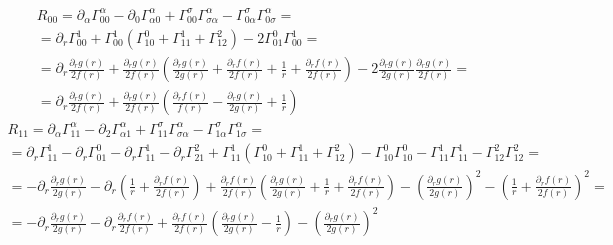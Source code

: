 \documentclass{article}
\begin{document}
\begin{equation}
\begin{gathered}
    R_{00} =
    \partial_\alpha \Gamma^\alpha_{00}
    - \partial_0 \Gamma^\alpha_{\alpha 0}
    + \Gamma^{\sigma}_{00}\Gamma^{\alpha}_{\sigma\alpha} 
    - \Gamma^{\sigma}_{0\alpha}\Gamma^{\alpha}_{0 \sigma} = \\ =
    \partial_r \Gamma^1_{00}
    + \Gamma^{1}_{00}\left(\Gamma^{0}_{10} + \Gamma^{1}_{11} + \Gamma^{2}_{12}\right)
    - 2\Gamma^{0}_{01}\Gamma^{1}_{00}
    = \\ =
    \partial_r \frac{\partial_{r}g(r)}{2f(r)}
    + \frac{\partial_{r}g(r)}{2f(r)}\left(\frac{\partial_{r}g(r)}{2g(r)} + \frac{\partial_r f(r)}{2f(r)} + \frac{1}{r} + \frac{\partial_r f(r)}{2f(r)}\right)
    - 2\frac{\partial_{r}g(r)}{2g(r)}\frac{\partial_{r}g(r)}{2f(r)}
    = \\ =
    \partial_r \frac{\partial_{r}g(r)}{2f(r)}
    + \frac{\partial_{r}g(r)}{2f(r)}\left(\frac{\partial_r f(r)}{f(r)} - \frac{\partial_{r}g(r)}{2g(r)} + \frac{1}{r}\right)
\end{gathered}
\end{equation}
\begin{equation}
\begin{gathered}
    R_{11} =
    \partial_\alpha \Gamma^\alpha_{11}
    - \partial_2 \Gamma^\alpha_{\alpha 1}
    + \Gamma^{\sigma}_{11}\Gamma^{\alpha}_{\sigma\alpha} 
    - \Gamma^{\sigma}_{1\alpha}\Gamma^{\alpha}_{1 \sigma} = \\ =
    \partial_r \Gamma^1_{11}
    - \partial_r \Gamma^0_{01}
    - \partial_r \Gamma^1_{11}
    - \partial_r \Gamma^2_{21}
    + \Gamma^{1}_{11}\left(\Gamma^{0}_{10} + \Gamma^{1}_{11} + \Gamma^{2}_{12}\right)
    - \Gamma^{0}_{10}\Gamma^{0}_{10}
    - \Gamma^{1}_{11}\Gamma^{1}_{11}
    - \Gamma^{2}_{12}\Gamma^{2}_{12} = \\ =
    - \partial_r \frac{\partial_{r}g(r)}{2g(r)}
    - \partial_r \left(\frac{1}{r} + \frac{\partial_r f(r)}{2f(r)}\right)
    + \frac{\partial_r f(r)}{2f(r)}\left(\frac{\partial_{r}g(r)}{2g(r)} + \frac{1}{r} + \frac{\partial_r f(r)}{2f(r)}\right)
    - \left(\frac{\partial_{r}g(r)}{2g(r)}\right)^2
    - \left(\frac{1}{r} + \frac{\partial_r f(r)}{2f(r)}\right)^2 = \\ =
    - \partial_r \frac{\partial_{r}g(r)}{2g(r)}
    - \partial_r \frac{\partial_r f(r)}{2f(r)}
    + \frac{\partial_r f(r)}{2f(r)}\left(\frac{\partial_{r}g(r)}{2g(r)} - \frac{1}{r}\right)
    - \left(\frac{\partial_{r}g(r)}{2g(r)}\right)^2
\end{gathered}
\end{equation}
\end{document}
